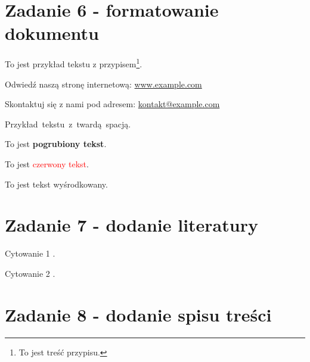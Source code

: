 \documentclass[b5paper,11pt]{article}
\begin{document}
\begin{spacing}{1.5}
    \newpage
    \section{Zadanie 6 - formatowanie dokumentu}

    To jest przykład tekstu z przypisem\footnote{To jest treść przypisu.}.

    Odwiedź naszą stronę internetową: \href{https://www.example.com}{www.example.com}

    Skontaktuj się z nami pod adresem: \href{mailto:kontakt@example.com}{kontakt@example.com}

    Przykład~tekstu~z~twardą~spacją.

    To jest \textbf{pogrubiony tekst}.

    To jest \textcolor{red}{czerwony tekst}.
    \begin{center}
        To jest tekst wyśrodkowany.
    \end{center}

    \newpage
    \section{Zadanie 7 - dodanie literatury}

    Cytowanie 1 \cite{Kowol2009}.

    Cytowanie 2 \cite{Mynarek2011}.


    \newpage
    \section{Zadanie 8 - dodanie spisu treści}

    \tableofcontents

    \listoftables

    \listoffigures

\end{spacing}
\end{document}

